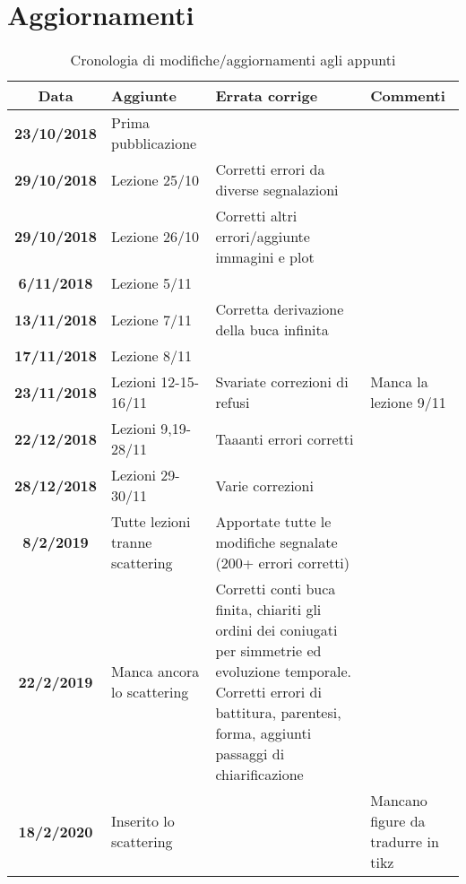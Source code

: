 \section*{Aggiornamenti}
\begin{table}[hb]
    \centering
    \begin{tabular}{|cm{3cm}m{5cm}m{3cm}|}\toprule
        Data & Aggiunte & Errata corrige & Commenti\\\midrule
        \textbf{23/10/2018} & Prima pubblicazione & & \\
        \textbf{29/10/2018} & Lezione 25/10 & Corretti errori da diverse segnalazioni & \\
        \textbf{29/10/2018} & Lezione 26/10 & Corretti altri errori/aggiunte immagini e plot & \\
        \textbf{6/11/2018} & Lezione 5/11 & &\\
        \textbf{13/11/2018} & Lezione 7/11 & Corretta derivazione della buca infinita &\\
        \textbf{17/11/2018} & Lezione 8/11 & &\\
        \textbf{23/11/2018} & Lezioni 12-15-16/11 & Svariate correzioni di refusi & Manca la lezione 9/11\\
        \textbf{22/12/2018} & Lezioni 9,19-28/11 & Taaanti errori corretti & \\
        \textbf{28/12/2018} & Lezioni 29-30/11 & Varie correzioni &\\
        \textbf{8/2/2019} & Tutte lezioni tranne scattering & Apportate tutte le modifiche segnalate (200+ errori corretti) \\
        \textbf{22/2/2019} & Manca ancora lo scattering & Corretti conti buca finita, chiariti gli ordini dei coniugati per simmetrie ed evoluzione temporale. Corretti errori di battitura, parentesi, forma, aggiunti passaggi di chiarificazione \\
        \textbf{18/2/2020} & Inserito lo scattering & & Mancano figure da tradurre in tikz \\
        \bottomrule
    \end{tabular}
    \caption{Cronologia di modifiche/aggiornamenti agli appunti}
    \label{updates}
\end{table}

\clearpage